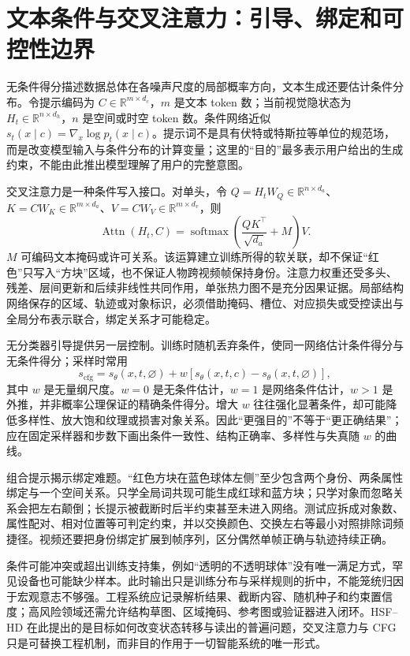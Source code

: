 \section{文本条件与交叉注意力：引导、绑定和可控性边界}
\label{sec:prompt_gauge_field}

无条件得分描述数据总体在各噪声尺度的局部概率方向，文本生成还要估计条件分布。令提示编码为 $C\in\mathbb{R}^{m\times d_c}$，$m$ 是文本 token 数；当前视觉隐状态为 $H_t\in\mathbb{R}^{n\times d_h}$，$n$ 是空间或时空 token 数。条件网络近似 $s_t(x\mid c)=\nabla_x\log p_t(x\mid c)$。提示词不是具有伏特或特斯拉等单位的规范场，而是改变模型输入与条件分布的计算变量；这里的“目的”最多表示用户给出的生成约束，不能由此推出模型理解了用户的完整意图。

交叉注意力是一种条件写入接口。对单头，令 $Q=H_tW_Q\in\mathbb{R}^{n\times d_a}$、$K=CW_K\in\mathbb{R}^{m\times d_a}$、$V=CW_V\in\mathbb{R}^{m\times d_v}$，则
\begin{equation}
\operatorname{Attn}(H_t,C)=\operatorname{softmax}\left(\frac{QK^\top}{\sqrt{d_a}}+M\right)V.
\end{equation}
$M$ 可编码文本掩码或许可关系。该运算建立训练所得的软关联，却不保证“红色”只写入“方块”区域，也不保证人物跨视频帧保持身份。注意力权重还受多头、残差、层间更新和后续非线性共同作用，单张热力图不是充分因果证据。局部结构网络保存的区域、轨迹或对象标识，必须借助掩码、槽位、对应损失或受控读出与全局分布表示联合，绑定关系才可能稳定。

无分类器引导提供另一层控制。训练时随机丢弃条件，使同一网络估计条件得分与无条件得分；采样时常用
\begin{equation}
s_{\mathrm{cfg}}=s_\theta(x,t,\varnothing)+w\left[s_\theta(x,t,c)-s_\theta(x,t,\varnothing)\right],
\end{equation}
其中 $w$ 是无量纲尺度。$w=0$ 是无条件估计，$w=1$ 是网络条件估计，$w>1$ 是外推，并非概率公理保证的精确条件得分。增大 $w$ 往往强化显著条件，却可能降低多样性、放大饱和纹理或损害对象关系。因此“更强目的”不等于“更正确结果”；应在固定采样器和步数下画出条件一致性、结构正确率、多样性与失真随 $w$ 的曲线。

组合提示揭示绑定难题。“红色方块在蓝色球体左侧”至少包含两个身份、两条属性绑定与一个空间关系。只学全局词共现可能生成红球和蓝方块；只学对象而忽略关系会把左右颠倒；长提示被截断时后半约束甚至未进入网络。测试应拆成对象数、属性配对、相对位置等可判定约束，并以交换颜色、交换左右等最小对照排除词频捷径。视频还要把身份绑定扩展到帧序列，区分偶然单帧正确与轨迹持续正确。

条件可能冲突或超出训练支持集，例如“透明的不透明球体”没有唯一满足方式，罕见设备也可能缺少样本。此时输出只是训练分布与采样规则的折中，不能笼统归因于宏观意志不够强。工程系统应记录解析结果、截断内容、随机种子和约束置信度；高风险领域还需允许结构草图、区域掩码、参考图或验证器进入闭环。HSF--HD 在此提出的是目标如何改变状态转移与读出的普遍问题，交叉注意力与 CFG 只是可替换工程机制，而非目的作用于一切智能系统的唯一形式。

